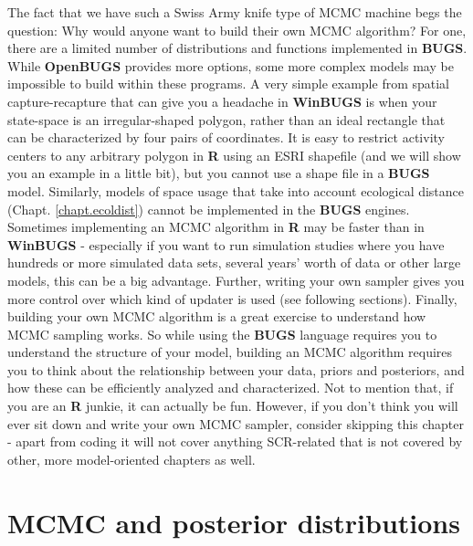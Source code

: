 The fact that we have such a Swiss Army knife type of MCMC machine
begs the question: Why would anyone want to build their own MCMC
algorithm? For one, there are a limited number of distributions and
functions implemented in {\bf BUGS}. While {\bf OpenBUGS} provides more
options, some more complex models may be impossible to build within
these programs. A very simple example from spatial capture-recapture
that can give you a headache in {\bf WinBUGS} is when your state-space is an
irregular-shaped polygon, rather than an ideal rectangle that can be
characterized by four pairs of coordinates. It is easy to restrict
activity centers to any arbitrary polygon in {\bf R} using an ESRI shapefile
(and we will show you an example in a little bit), but you cannot use
a shape file in a {\bf BUGS} model.  Similarly, models of space usage
that take into account ecological distance
(Chapt. \ref{chapt.ecoldist}) cannot be implemented in the {\bf BUGS}
engines.  
Sometimes implementing an MCMC algorithm in {\bf R} may be faster than in
{\bf WinBUGS} - especially if you want to run simulation studies where you
have hundreds or more simulated data sets, several years' worth of
data or other large models, this can be a big advantage. Further, writing your own sampler gives you more control over which kind of updater is used (see following sections).
Finally, building your own MCMC algorithm is a great exercise to
understand how MCMC sampling works. So while using the {\bf BUGS}
language requires you to understand the structure of your model,
building an MCMC algorithm requires you to think about the
relationship between your data, priors and posteriors, and how these
can be efficiently analyzed and characterized. Not to mention that, if
you are an {\bf R} junkie, it can actually be fun.  However, if you
don't think you will ever sit down and write your own MCMC sampler,
consider skipping this chapter - apart from coding it will not cover
anything SCR-related that is not covered by other, more model-oriented
chapters as well.


\section{MCMC and posterior distributions}

